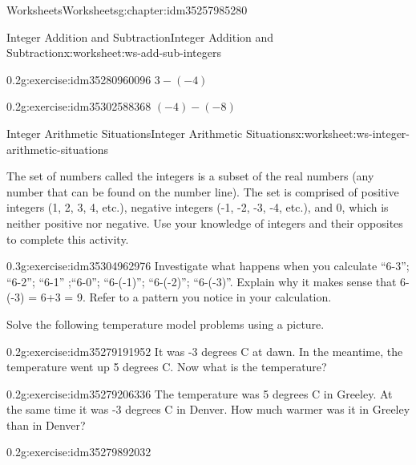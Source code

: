 \documentclass[twoside,11pt,]{book}
\begin{document}
\begin{chapterptx}{Worksheets}{}{Worksheets}{}{}{g:chapter:idm35257985280}
\begin{worksheet-section-numberless}{Integer Addition and Subtraction}{}{Integer Addition and Subtraction}{}{}{x:worksheet:ws-add-sub-integers}
\begin{divisionexercise}{7}{}{0.2}{g:exercise:idm35280960096}%
\(3-(-4) \)%
\end{divisionexercise}%
\begin{divisionexercise}{8}{}{0.2}{g:exercise:idm35302588368}%
\((-4)-(-8) \)%
\end{divisionexercise}%
\end{worksheet-section-numberless}
\restoregeometry
%
%
\typeout{************************************************}
\typeout{************************************************}
%
\begin{worksheet-section-numberless}{Integer Arithmetic Situations}{}{Integer Arithmetic Situations}{}{}{x:worksheet:ws-integer-arithmetic-situations}
\begin{introduction}{}%
The set of numbers called the integers is a subset of the real numbers (any number that can be found on the number line).  The set is comprised of positive integers (1, 2, 3, 4, etc.), negative integers (-1, -2, -3, -4, etc.), and 0, which is neither positive nor negative.  Use your knowledge of integers and their opposites to complete this activity.%
\end{introduction}%
\begin{divisionexercise}{1}{}{0.3}{g:exercise:idm35304962976}%
Investigate what happens when you calculate ``6-3'';  ``6-2'';  ``6-1'' ;``6-0''; ``6-(-1)'';     ``6-(-2)''; ``6-(-3)''.  Explain why it makes sense that 6- (-3) = 6+3 = 9.   Refer to a pattern you notice in your calculation.%
\end{divisionexercise}%
\begin{introduction}{}%
Solve the following temperature model problems using a picture.%
\end{introduction}%
\begin{divisionexercise}{2}{}{0.2}{g:exercise:idm35279191952}%
It was -3 degrees C at dawn. In the meantime, the temperature went up 5 degrees C. Now what is the temperature?%
\end{divisionexercise}%
\clearpage
\begin{divisionexercise}{3}{}{0.2}{g:exercise:idm35279206336}%
The temperature was 5 degrees C in Greeley. At the same time it was -3 degrees C in Denver. How much warmer was it in Greeley than in Denver?%
\end{divisionexercise}%
\begin{divisionexercise}{4}{}{0.2}{g:exercise:idm35279892032}%

\end{divisionexercise}
\end{worksheet-section-numberless}
\end{chapterptx}
\end{document}
